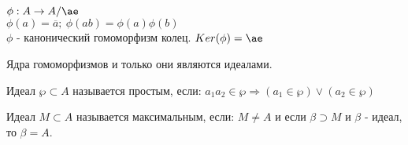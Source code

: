 \begin{thm}
$\phi: A \rightarrow A/\ae$ \\
$\phi(a) = \overline{a};~\phi(ab) = \phi(a)\phi(b)$ \\
$\phi$ - канонический гомоморфизм колец. $Ker(\phi) = \ae$
\end{thm}

\begin{thm}
Ядра гомоморфизмов и только они являются идеалами.
\end{thm}

\begin{defn}
Идеал $\wp \subset A$ называется простым, если: $a_1a_2 \in \wp \Rightarrow (a_1 \in \wp)\vee(a_2 \in \wp)$
\end{defn}

\begin{defn}
Идеал $M \subset A$ называется максимальным, если: $M \neq A$ и если $\beta \supset M$ и $\beta$ - идеал, то $\beta = A$.
\end{defn}
